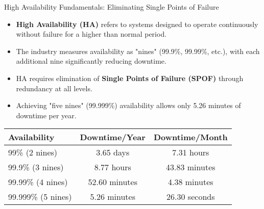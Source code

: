 \documentclass{beamer}
\begin{document}
\begin{frame}{High Availability Fundamentals: Eliminating Single Points of Failure}
    \begin{itemize}
        \item \textbf{High Availability (HA)} refers to systems designed to operate continuously without failure for a higher than normal period.
        \item The industry measures availability as "nines" (99.9\%, 99.99\%, etc.), with each additional nine significantly reducing downtime.
        \item HA requires elimination of \textbf{Single Points of Failure (SPOF)} through redundancy at all levels.
        \item Achieving "five nines" (99.999\%) availability allows only 5.26 minutes of downtime per year.
    \end{itemize}
    
    \begin{table}
        \centering
        \begin{tabular}{lcc}
            \toprule
            \textbf{Availability} & \textbf{Downtime/Year} & \textbf{Downtime/Month} \\
            \midrule
            99\% (2 nines) & 3.65 days & 7.31 hours \\
            99.9\% (3 nines) & 8.77 hours & 43.83 minutes \\
            99.99\% (4 nines) & 52.60 minutes & 4.38 minutes \\
            99.999\% (5 nines) & 5.26 minutes & 26.30 seconds \\
            \bottomrule
        \end{tabular}
    \end{table}
\end{frame}
\end{document}
